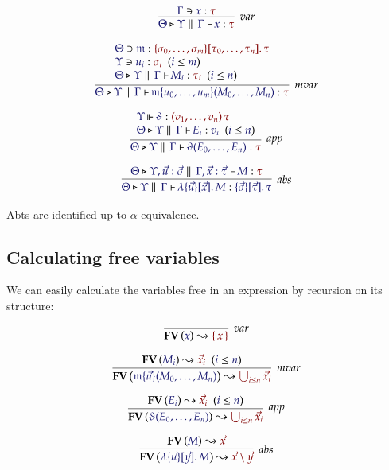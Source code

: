 \documentclass[11pt]{article}
\theoremstyle{definition}
\theoremstyle{remark}
\numberwithin{equation}{section}
\newcommand\CalcFV[2]{
  \FV{\IMode{#1}}\leadsto \OMode{#2}
}
\begin{document}
\begin{gather*}
  \infer[\textit{var}]{
    \IsAbt{\Theta}{\Upsilon}{\Gamma}{x}{\tau}
  }{
    \Lookup{\Gamma}{x}{\tau}
  }
\\[6pt]
  \infer[\textit{mvar}]{
    \IsAbt{\Theta}{\Upsilon}{\Gamma}{
      \MApp{\MV{m}}{u_0,\dots,u_m}{M_0,\dots,M_n}
    }{\tau}
  }{
    \begin{array}{l}
      \Lookup{\Theta}{\MV{m}}{
        \MkValence{
          \sigma_0,\dots,\sigma_m
        }{
          \tau_0,\dots,\tau_n
        }{\tau}
      }
\\
      \HypJ{
        \Lookup{\Upsilon}{u_i}{\sigma_i}
      }{\Leq{i}{m}}
\\
      \HypJ{
        \IsAbt{\Theta}{\Upsilon}{\Gamma}{M_i}{\tau_i}
      }{\Leq{i}{n}}
    \end{array}
  }
\\[6pt]
  \infer[\textit{app}]{
    \IsAbt{\Theta}{\Upsilon}{\Gamma}{
      \App{\vartheta}{E_0,\dots,E_n}
    }{\tau}
  }{
    \begin{array}{l}
      \IsOperator{\Upsilon}{\vartheta}{
        \MkArity{v_1,\dots,v_n}{\tau}
      }
\\
      \HypJ{
        \IsBTm{\Theta}{\Upsilon}{\Gamma}{E_i}{v_i}
      }{\Leq{i}{n}}
    \end{array}
  }
\\[6pt]
  \infer[\textit{abs}]{
    \IsBTm{\Theta}{\Upsilon}{\Gamma}{
      \MkBTm{\vec{u}}{\vec{x}}{M}
    }{
      \MkValence{\vec{\sigma}}{\vec{\tau}}{\tau}
    }
  }{
    \IsAbt{
      \Theta
    }{
      \Upsilon, \vec{u}:\vec{\sigma}
    }{
      \Gamma,\vec{x}:{\vec{\tau}}
    }{
      M
    }{\tau}
  }
\end{gather*}

Abts are identified up to $\alpha$-equivalence.

\subsection{Calculating free variables}

We can easily calculate the variables free in an expression by recursion on its
structure:

\begin{gather*}
  \infer[\textit{var}]{
    \CalcFV{x}{\MkSet{x}}
  }{
  }\\[6pt]
  \infer[\textit{mvar}]{
    \CalcFV{
      \MApp{\MV{m}}{\vec{u}}{M_0,\dots,M_n}
    }{
      \bigcup_{i\leq n} \vec{x}_i
    }
  }{
    \HypJ{
      \CalcFV{M_i}{\vec{x}_i}
    }{
      \Leq{i}{n}
    }
  }\\[6pt]
  \infer[\textit{app}]{
    \CalcFV{
      \App{\vartheta}{E_0,\dots,E_n}
    }{
      \bigcup_{i\leq n} \vec{x}_i
    }
  }{
    \HypJ{
      \CalcFV{E_i}{\vec{x}_i}
    }{
      \Leq{i}{n}
    }
  }\\[6pt]
  \infer[\textit{abs}]{
    \CalcFV{
      \MkBTm{\vec{u}}{\vec{y}}{M}
    }{
      \vec{x}\setminus\vec{y}
    }
  }{
    \CalcFV{M}{\vec{x}}
  }
\end{gather*}
\end{document}

